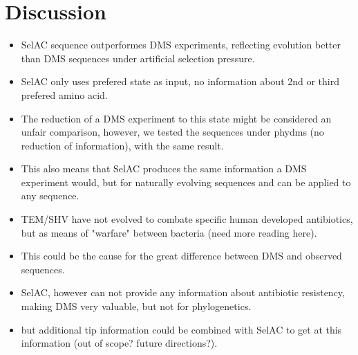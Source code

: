 \documentclass[12pt]{article}
\begin{document}
\section*{Discussion}
\begin{itemize}
	\item SelAC sequence outperformes DMS experiments, reflecting evolution better than DMS sequences under artificial selection pressure.
	\item SelAC only uses prefered state as input, no information about 2nd or third prefered amino acid.
	\item The reduction of a DMS experiment to this state might be considered an unfair comparison, however, we tested the sequences under phydms (no reduction of information), with the same result.
	\item This also means that SelAC produces the same information a DMS experiment would, but for naturally evolving sequences and can be applied to any sequence.
	\item TEM/SHV have not evolved to combate specific human developed antibiotics, but as means of "warfare" between bacteria (need more reading here).
	\item This could be the cause for the great difference between DMS and observed sequences.
	\item SelAC, however can not provide any information about antibiotic resistency, making DMS very valuable, but not for phylogenetics. 
	\item but additional tip information could be combined with SelAC to get at this information (out of scope? future directions?).
\end{itemize}
\end{document}
